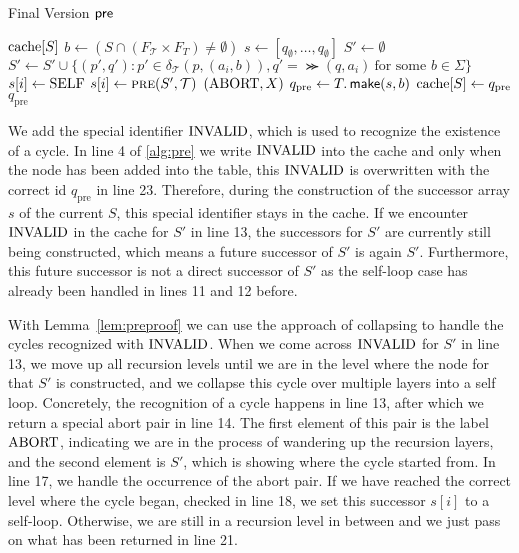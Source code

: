 \begin{algorithm}[ht]
\caption{Final Version $\operatorname{\textsf{pre}}$}\label{alg:pre}
\begin{algorithmic}[1]
\If{$\cache[S]$}
\Return $\cache[S]$
\EndIf
\color{blue!75}
\State {$\cache[S] \gets \invalid$} 
\color{black}
\State $b \gets (S \cap (F_{\mathcal{T}} \times F_{T} ) \neq \emptyset)$
\State $s \gets [q_{\emptyset},\dots,q_{\emptyset}]$
\State $S' \gets \emptyset$
\State $S' \gets S' \cup \{ (p',q'): p' \in \delta_{\mathcal{T}}(p,(a_{i},b)), q'=\Succ(q,a_{i}) \ \text{for some $b \in \Sigma$} \}$
\EndFor
{}
\State $s[i] \gets \mathrm{SELF}$
\color{blue!75}
\ElsIf {$\cache[S'] = \invalid$}
\color{black}
\Else
\State $s[i] \gets \Call{pre}{S',\mathcal{T}}$
\color{blue!75}
\Else
\Return $(\mathrm{ABORT}, X)$
\color{black}
\EndIf 
\EndIf
\EndIf
\EndFor
\State $q_{\text{pre}} \gets T.\operatorname{\textsf{make}}(s,b)$
\State $\mathrm{cache}[S] \gets q_{\text{pre}}$
\Return $q_{\text{pre}} $
\EndProcedure
\end{algorithmic}
\end{algorithm}



We add the special identifier $\invalid$, which is used to recognize the existence of a cycle. In line 4 of \autoref{alg:pre} we write $\invalid$ into the cache and only when the node has been added into the table, this $\invalid$ is overwritten with the correct id $q_{\text{pre}}$ in line 23. Therefore, during the construction of the successor array $s$ of the current $S$, this special identifier stays in the cache. If we encounter $\invalid$ in the cache for $S'$ in line 13, the successors for $S'$ are currently still being constructed, which means a future successor of $S'$ is again $S'$. Furthermore, this future successor is not a direct successor of $S'$ as the self-loop case has already been handled in lines 11 and 12 before.

\par

With Lemma~\autoref{lem:preproof} we can use the approach of collapsing to handle the cycles recognized with $\invalid$. When we come across $\invalid$ for $S'$ in line 13, we move up all recursion levels until we are in the level where the node for that $S'$ is constructed, and we collapse this cycle over multiple layers into a self loop. 
Concretely, the recognition of a cycle happens in line 13, after which we return a special abort pair in line 14. 
The first element of this pair is the label $\mathrm{ABORT}$, indicating we are in the process of wandering up the recursion layers, and the second element is $S'$, which is showing where the cycle started from. 
In line 17, we handle the occurrence of the abort pair. If we have reached the correct level where the cycle began, checked in line 18, we set this successor $s[i]$ to a self-loop. Otherwise, we are still in a recursion level in between and we just pass on what has been returned in line 21.

